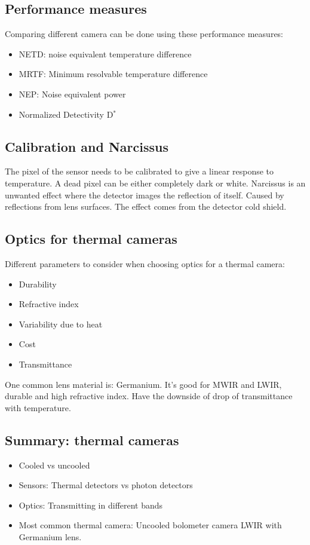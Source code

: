 	\subsection{Performance measures}
	Comparing different camera can be done using these performance measures:
	\begin{itemize}
		\item NETD: noise equivalent temperature difference
		\item MRTF: Minimum resolvable temperature difference
		\item NEP: Noise equivalent power
		\item Normalized Detectivity D$^{*}$ 
	\end{itemize}

	\subsection{Calibration and Narcissus}
	The pixel of the sensor needs to be calibrated to give a linear response to temperature. A dead pixel can be either completely dark or white. Narcissus is an unwanted effect where the detector images the reflection of itself. Caused by reflections from lens surfaces. The effect comes from the detector cold shield.

	\subsection{Optics for thermal cameras}
	Different parameters to consider when choosing optics for a thermal camera:

	\begin{itemize}
		\item Durability
		\item Refractive index
		\item Variability due to heat
		\item Cost
		\item Transmittance
	\end{itemize}

	One common lens material is: Germanium. It's good for MWIR and LWIR, durable and high refractive index. Have the downside of drop of transmittance with temperature. 

	\subsection{Summary: thermal cameras}
	\begin{itemize}
		\item Cooled vs uncooled
		\item Sensors: Thermal detectors vs photon detectors
		\item Optics: Transmitting in different bands
		\item Most common thermal camera: Uncooled bolometer camera LWIR with Germanium lens. 
	\end{itemize}
	

